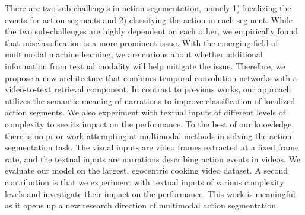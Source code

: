 There are two sub-challenges in action segementation, namely 1) localizing the events for action segments and 2) classifying the action in each segment. While the two sub-challenges are highly dependent on each other, we empirically found that misclassification is a more prominent issue. With the emerging field of multimodal machine learning, we are curious about whether additional information from textual modality will help mitigate the issue. Therefore, we propose a new architecture that combines temporal convolution networks with a video-to-text retrieval component. In contrast to previous works, our approach utilizes the semantic meaning of narrations to improve classification of localized action segments. We also experiment with textual inputs of different levels of complexity to see its impact on the performance. To the best of our knowledge, there is no prior work attempting at multimodal methods in solving the action segmentation task. The visual inputs are video frames extracted at a fixed frame rate, and the textual inputs are narrations describing action events in videos. We evaluate our model on the largest, egocentric cooking video dataset. A second contribution is that we experiment with textual inputs of various complexity levels and investigate their impact on the performance. This work is meaningful as it opens up a new research direction of multimodal action segmentation.

